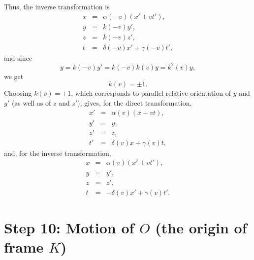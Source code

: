 \documentclass[twocolumn,preprintnumbers,amsmath,amssymb,final]{revtex4}
\def\BEq{\begin{equation}}
\def\EEq{\end{equation}}
\def\BEqA{\begin{eqnarray}}
\def\EEqA{\end{eqnarray}}
\def\a{\alpha}
\def\d{\delta}
\def\g{\gamma}
\begin{document}
\vskip10pt

Thus, the inverse transformation is
\BEqA
{x}&=&\a(-v)({x}' + vt'),
\\
{y}&=&k(-v){y'},
\\
z&=&k(-v)z',
\\
t&=&\d(-v){x}'+\g(-v)t',
\EEqA
and since
\BEq
{y}=k(-v){y'}=k(-v)k(v)y=k^2(v)y,
\EEq
we get
\BEq
k(v) = \pm 1.
\EEq
Choosing $k(v)=+1$, which corresponds to parallel relative orientation of $y$ and $y'$ 
(as well as of $z$ and $z'$), gives, for the direct transformation,
\BEqA
x'&=&\a(v)(x - vt),
\\
y'&=&y,
\\
z'&=&z,
\\
t'&=&\d(v)x+\g(v)t,
\EEqA
and, for the inverse transformation,
\BEqA
{x}&=&\a(v)({x}' + vt'),
\\
{y}&=&{y'},
\\
z&=&z',
\\
t&=&-\d(v){x}'+\g(v)t'.
\EEqA

\section*{Step 10: Motion of $O$ (the origin of frame $K$)}
 
\end{document}
